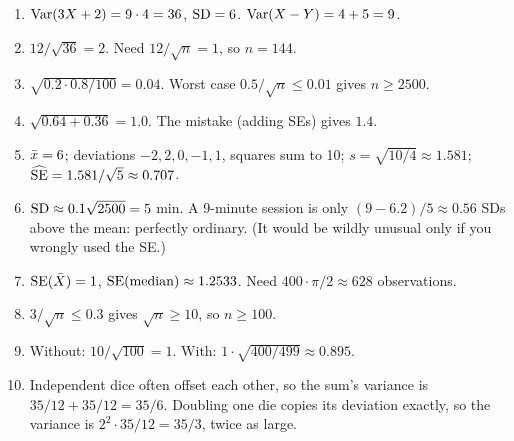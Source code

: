\begin{enumerate}
  \item $\operatorname{Var}(3X+2)=9\cdot 4=36$, $\operatorname{SD}=6$. $\operatorname{Var}(X-Y)=4+5=9$.
  \item $12/\sqrt{36}=2$. Need $12/\sqrt n=1$, so $n=144$.
  \item $\sqrt{0.2\cdot 0.8/100}=0.04$. Worst case $0.5/\sqrt n\le 0.01$ gives
  $n\ge 2500$.
  \item $\sqrt{0.64+0.36}=1.0$. The mistake (adding SEs) gives $1.4$.
  \item $\bar{x}=6$; deviations $-2,2,0,-1,1$, squares sum to 10; $s=\sqrt{10/4}\approx 1.581$;
  $\widehat{\operatorname{SE}}=1.581/\sqrt 5\approx 0.707$.
  \item $\operatorname{SD}\approx 0.1\sqrt{2500}=5$ min. A 9-minute session is only $(9-6.2)/5\approx 0.56$
  SDs above the mean: perfectly ordinary. (It would be wildly unusual only if you
  wrongly used the SE.)
  \item $\operatorname{SE}(\bar{X})=1$, $\operatorname{SE}(\text{median})\approx 1.2533$. Need $400\cdot\pi/2\approx 628$
  observations.
  \item $3/\sqrt n\le 0.3$ gives $\sqrt n\ge 10$, so $n\ge 100$.
  \item Without: $10/\sqrt{100}=1$. With: $1\cdot\sqrt{400/499}\approx 0.895$.
  \item Independent dice often offset each other, so the sum's variance is
  $35/12+35/12=35/6$. Doubling one die copies its deviation exactly, so the variance
  is $2^2\cdot 35/12=35/3$, twice as large.
\end{enumerate}
